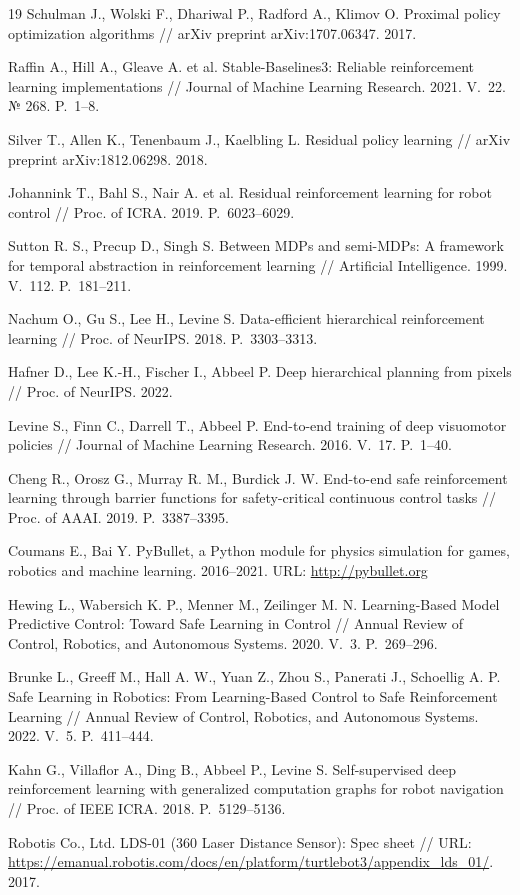 \documentclass[11pt]{article}
\begin{document}
\begin{thebibliography}{19}
Schulman J., Wolski F., Dhariwal P., Radford A., Klimov O. Proximal policy optimization algorithms
// arXiv preprint arXiv:1707.06347. 2017.

Raffin A., Hill A., Gleave A. et al. Stable-Baselines3: Reliable reinforcement learning implementations
// Journal of Machine Learning Research. 2021. V.~22. № 268. P.~1--8.

Silver T., Allen K., Tenenbaum J., Kaelbling L. Residual policy learning
// arXiv preprint arXiv:1812.06298. 2018.

Johannink T., Bahl S., Nair A. et al. Residual reinforcement learning for robot control
// Proc. of ICRA. 2019. P.~6023--6029.

Sutton R. S., Precup D., Singh S. Between MDPs and semi-MDPs: A framework for temporal abstraction in reinforcement learning
// Artificial Intelligence. 1999. V.~112. P.~181--211.

Nachum O., Gu S., Lee H., Levine S. Data-efficient hierarchical reinforcement learning
// Proc. of NeurIPS. 2018. P.~3303--3313.

Hafner D., Lee K.-H., Fischer I., Abbeel P. Deep hierarchical planning from pixels
// Proc. of NeurIPS. 2022.

Levine S., Finn C., Darrell T., Abbeel P. End-to-end training of deep visuomotor policies
// Journal of Machine Learning Research. 2016. V.~17. P.~1--40.

Cheng R., Orosz G., Murray R. M., Burdick J. W. End-to-end safe reinforcement learning through barrier functions for safety-critical continuous control tasks
// Proc. of AAAI. 2019. P.~3387--3395.

Coumans E., Bai Y. PyBullet, a Python module for physics simulation for games, robotics and machine learning. 2016--2021. URL: \url{http://pybullet.org}

Hewing L., Wabersich K. P., Menner M., Zeilinger M. N. Learning-Based Model Predictive Control: Toward Safe Learning in Control // Annual Review of Control, Robotics, and Autonomous Systems. 2020. V.~3. P.~269--296.

Brunke L., Greeff M., Hall A. W., Yuan Z., Zhou S., Panerati J., Schoellig A. P. Safe Learning in Robotics: From Learning-Based Control to Safe Reinforcement Learning // Annual Review of Control, Robotics, and Autonomous Systems. 2022. V.~5. P.~411--444.

Kahn G., Villaflor A., Ding B., Abbeel P., Levine S. Self-supervised deep reinforcement learning with generalized computation graphs for robot navigation // Proc. of IEEE ICRA. 2018. P.~5129--5136.

Robotis Co., Ltd. LDS-01 (360 Laser Distance Sensor): Spec sheet // URL: \url{https://emanual.robotis.com/docs/en/platform/turtlebot3/appendix_lds_01/}. 2017.

\end{thebibliography}
\end{document}
